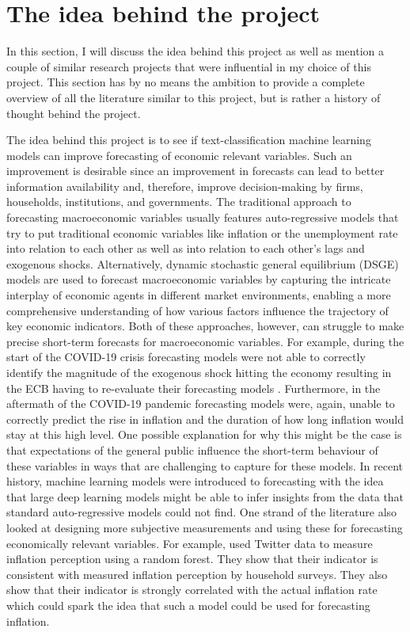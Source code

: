 \documentclass[11pt, a4paper, leqno]{article}
\begin{document}
\section{The idea behind the project}
In this section, I will discuss the idea behind this project as well as mention a couple of similar research projects that were influential in my choice of this project. This section has by no means the ambition to provide a complete overview of all the literature similar to this project, but is rather a history of thought behind the project.

The idea behind this project is to see if text-classification machine learning models can improve forecasting of economic relevant variables. Such an improvement is desirable since an improvement in forecasts can lead to better information availability and, therefore, improve decision-making by firms, households, institutions, and governments. The traditional approach to forecasting macroeconomic variables usually features auto-regressive models that try to put traditional economic variables like inflation or the unemployment rate into relation to each other as well as into relation to each other's lags and exogenous shocks. Alternatively, dynamic stochastic general equilibrium (DSGE) models are used to forecast macroeconomic variables by capturing the intricate interplay of economic agents in different market environments, enabling a more comprehensive understanding of how various factors influence the trajectory of key economic indicators. Both of these approaches, however, can struggle to make precise short-term forecasts for macroeconomic variables. For example, during the start of the COVID-19 crisis forecasting models were not able to correctly identify the magnitude of the exogenous shock hitting the economy resulting in the ECB having to re-evaluate their forecasting models \parencite{Battistini2021}. Furthermore, in the aftermath of the COVID-19 pandemic forecasting models were, again, unable to correctly predict the rise in inflation and the duration of how long inflation would stay at this high level. One possible explanation for why this might be the case is that expectations of the general public influence the short-term behaviour of these variables in ways that are challenging to capture for these models.
In recent history, machine learning models were introduced to forecasting with the idea that large deep learning models might be able to infer insights from the data that standard auto-regressive models could not find. One strand of the literature also looked at designing more subjective measurements and using these for forecasting economically relevant variables. For example, \textcite{Denes2022} used Twitter data to measure inflation perception using a random forest. They show that their indicator is consistent with measured inflation perception by household surveys. They also show that their indicator is strongly correlated with the actual inflation rate which could spark the idea that such a model could be used for forecasting inflation.
\end{document}
